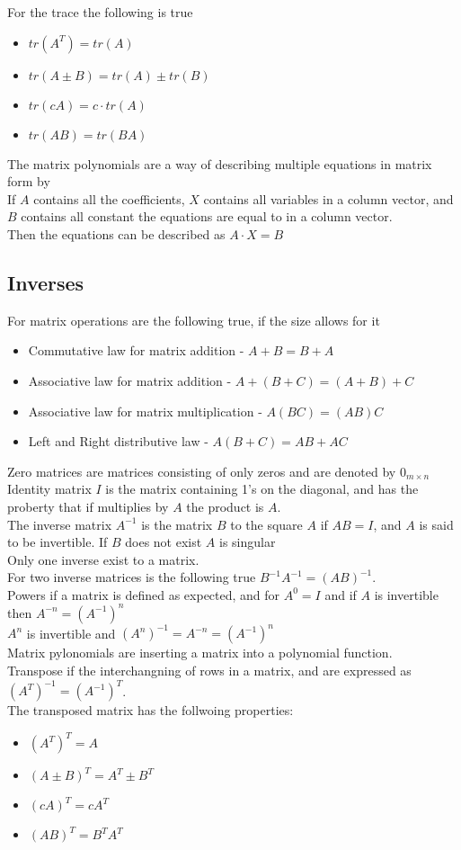 \documentclass[12pt, a4paper]{article}
\begin{document}
				For the trace the following is true
				\begin{itemize}
					\item $tr(A^T)=tr(A)$
					\item $tr(A\pm B)=tr(A)\pm tr(B)$
					\item $tr(cA)=c\cdot tr(A)$
					\item $tr(AB)=tr(BA)$
				\end{itemize}
				The matrix polynomials are a way of describing multiple equations in matrix form by\\
				If $A$ contains all the coefficients, $X$ contains all variables in a column vector, and $B$ contains all constant the equations are equal to in a column vector.\\
				Then the equations can be described as  $A\cdot X=B$
		\subsection{Inverses}
			For matrix operations are the following true, if the size allows for it
			\begin{itemize}
				\item Commutative law for matrix addition - $A + B = B + A$
				\item Associative law for matrix addition - $A + ( B + C) = (A+B)+C$
				\item Associative law for matrix multiplication - $A(BC)=(AB)C$\\
				\item Left and Right distributive law - $A(B+C)=AB+AC$
			\end{itemize}
			Zero matrices are matrices consisting of only zeros and are denoted by $0_{m\times n}$\\
			Identity matrix $I$ is the matrix containing 1's on the diagonal, and has the proberty that if multiplies by $A$ the product is $A$.\\
			The inverse matrix $A^{-1}$ is the matrix $B$ to the square $A$ if $AB=I$, and $A$ is said to be invertible. If $B$ does not exist $A$ is singular\\
			Only one inverse exist to a matrix.\\
			For two inverse matrices is the following true $B^{-1}A^{-1}=(AB)^{-1}$.\\
			Powers if a matrix is defined as expected, and for $A^0=I$ and if $A$ is invertible then $A^{-n}=(A^{-1})^n$\\
			$A^n$ is invertible and $(A^n)^{-1}=A^{-n}=(A^{-1})^n$\\
			Matrix pylonomials are inserting a matrix into a polynomial function.\\
			Transpose if the interchangning of rows in a matrix, and are expressed as $(A^T)^{-1}=(A^{-1})^T$.\\
			The transposed matrix has the follwoing properties:
			\begin{itemize}
				\item $(A^T)^T=A$
				\item $(A\pm B)^T=A^T\pm B^T$ 
				\item $(cA)^T=cA^T$
				\item $(AB)^T=B^TA^T$
			\end{itemize}
				
				
\end{document}
